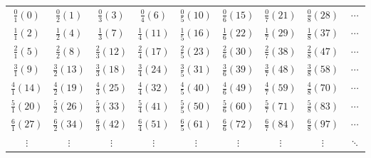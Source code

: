 \documentclass[border=10pt]{standalone}
\begin{document}
\begin{tabular}{ccccccccc}
	$\frac{0}{1} (0) $  & $\frac{0}{2} (1)$ & $\frac{0}{3} (3)$ & $\frac{0}{4} (6)$ & $\frac{0}{5} (10)$ & $\frac{0}{6} (15) $ & $\frac{0}{7} (21) $ & $\frac{0}{8} (28)$ & $\cdots$ \\ [1ex] 
	$\frac{1}{1} (2)$ & $\frac{1}{2} (4)$ & $\frac{1}{3} (7)$ & $\frac{1}{4} (11)$ & $\frac{1}{5} (16)$ & $\frac{1}{6} (22)$ & $\frac{1}{7} (29)$ & $\frac{1}{8} (37)$ & $\cdots$\\ [1ex] 
	$\frac{2}{1} (5)$ & $\frac{2}{2} (8)$ & $\frac{2}{3} (12)$ & $\frac{2}{4} (17)$ & $\frac{2}{5} (23)$ & $\frac{2}{6} (30)$ & $\frac{2}{7} (38)$ & $\frac{2}{8} (47)$ & $\cdots$\\ [1ex] 
	$\frac{3}{1} (9)$ & $\frac{3}{2} (13)$ & $\frac{3}{3} (18)$ & $\frac{3}{4} (24)$ & $\frac{3}{5} (31)$ & $\frac{3}{6} (39)$ & $\frac{3}{7} (48)$ & $\frac{3}{8} (58)$ & $\cdots$\\ [1ex] 
	$\frac{4}{1} (14)$ & $\frac{4}{2} (19)$ & $\frac{4}{3} (25)$ & $\frac{4}{4} (32)$ & $\frac{4}{5} (40)$ & $\frac{4}{6} (49)$ & $\frac{4}{7} (59)$ & $\frac{4}{8} (70)$ & $\cdots$\\ [1ex] 
	$\frac{5}{1} (20)$ & $\frac{5}{2} (26)$ & $\frac{5}{3} (33)$ & $\frac{5}{4} (41)$ & $\frac{5}{5} (50)$ & $\frac{5}{6} (60)$ & $\frac{5}{7} (71)$ & $\frac{5}{8} (83)$ & $\cdots$\\ [1ex] 
	$\frac{6}{1} (27)$ & $\frac{6}{2} (34)$ & $\frac{6}{3} (42)$ & $\frac{6}{4} (51)$ & $\frac{6}{5} (61)$ & $\frac{6}{6} (72)$ & $\frac{6}{7} (84)$ & $\frac{6}{8} (97)$ & $\cdots$\\ [1ex] 
	$\vdots$      &  $\vdots$     &   $\vdots$    &   $\vdots$    &   $\vdots$    &   $\vdots$    &   $\vdots$    &   $\vdots$    & $\ddots$ \\
\end{tabular}
\end{document}
